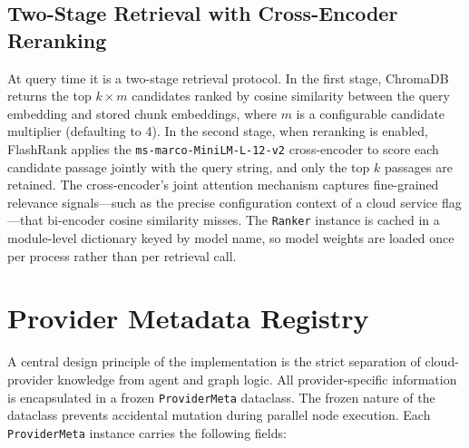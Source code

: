 \subsection{Two-Stage Retrieval with Cross-Encoder Reranking}

At query time it is a two-stage retrieval protocol. In the first stage, ChromaDB returns the top $k \times m$ candidates ranked by cosine similarity between the query embedding and stored chunk embeddings, where $m$ is a configurable candidate multiplier (defaulting to 4). In the second stage, when reranking is enabled, FlashRank applies the \texttt{ms-marco-MiniLM-L-12-v2} cross-encoder to score each candidate passage jointly with the query string, and only the top $k$ passages are retained. The cross-encoder's joint attention mechanism captures fine-grained relevance signals---such as the precise configuration context of a cloud service flag---that bi-encoder cosine similarity misses. The \texttt{Ranker} instance is cached in a module-level dictionary keyed by model name, so model weights are loaded once per process rather than per retrieval call.

\section{Provider Metadata Registry}
\label{sec:provider_meta}

A central design principle of the implementation is the strict separation of cloud-provider knowledge from agent and graph logic. All provider-specific information is encapsulated in a frozen \texttt{ProviderMeta} dataclass. The frozen nature of the dataclass prevents accidental mutation during parallel node execution. Each \texttt{ProviderMeta} instance carries the following fields:

